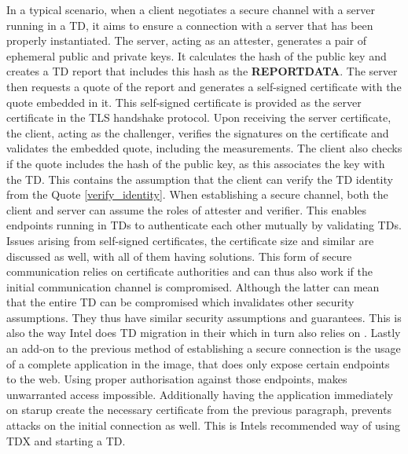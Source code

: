 In a typical scenario, when a client negotiates a secure channel with a server running in a TD, it aims to ensure a connection with a server that has been properly instantiated. The server, acting as an attester, generates a pair of ephemeral public and private keys. It calculates the hash of the public key and creates a TD report that includes this hash as the \textbf{REPORTDATA}. The server then requests a quote of the report and generates a self-signed certificate with the quote embedded in it. This self-signed certificate is provided as the server certificate in the TLS handshake protocol. Upon receiving the server certificate, the client, acting as the challenger, verifies the signatures on the certificate and validates the embedded quote, including the measurements. The client also checks if the quote includes the hash of the public key, as this associates the key with the TD. This contains the assumption that the client can verify the TD identity from the Quote \ref{verify_identity}. When establishing a secure channel, both the client and server can assume the roles of attester and verifier. This enables endpoints running in TDs to authenticate each other mutually by validating TDs\cite{knauth_integrating_2019}. Issues arising from self-signed certificates, the certificate size and similar are discussed as well, with all of them  having solutions. This form of secure communication relies on certificate authorities and can thus also work if the initial communication channel is compromised. Although the latter can mean that the entire TD can be compromised which invalidates other security assumptions. They thus have similar security assumptions and guarantees. This is also the way Intel does TD migration in their \cite{td_mmigration_design} which in turn also relies on \cite{knauth_integrating_2019}.
Lastly an add-on to the previous method of establishing a secure connection is the usage of a complete application in the image, that does only expose certain endpoints to the web. Using proper authorisation against those endpoints, makes unwarranted access impossible. Additionally having the application immediately on starup create the necessary certificate from the previous paragraph, prevents attacks on the initial connection as well. This is Intels recommended way of using TDX and starting a TD. 

